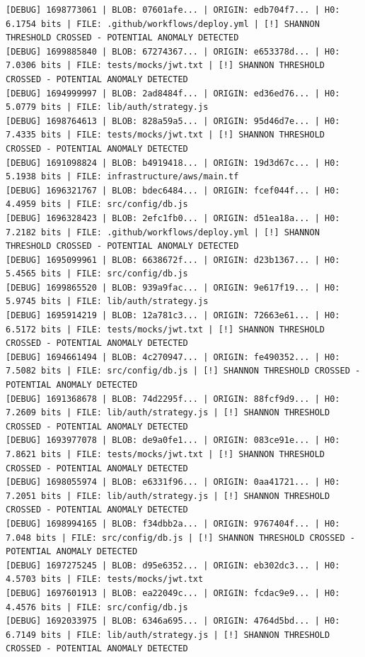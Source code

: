 \documentclass[12pt, a4paper, oneside]{report}
\begin{document}
\begin{lstlisting}[basicstyle=\tiny\ttfamily]
[DEBUG] 1698773061 | BLOB: 07601afe... | ORIGIN: edb704f7... | H0: 6.1754 bits | FILE: .github/workflows/deploy.yml | [!] SHANNON THRESHOLD CROSSED - POTENTIAL ANOMALY DETECTED
[DEBUG] 1699885840 | BLOB: 67274367... | ORIGIN: e653378d... | H0: 7.0306 bits | FILE: tests/mocks/jwt.txt | [!] SHANNON THRESHOLD CROSSED - POTENTIAL ANOMALY DETECTED
[DEBUG] 1694999997 | BLOB: 2ad8484f... | ORIGIN: ed36ed76... | H0: 5.0779 bits | FILE: lib/auth/strategy.js
[DEBUG] 1698764613 | BLOB: 828a59a5... | ORIGIN: 95d46d7e... | H0: 7.4335 bits | FILE: tests/mocks/jwt.txt | [!] SHANNON THRESHOLD CROSSED - POTENTIAL ANOMALY DETECTED
[DEBUG] 1691098824 | BLOB: b4919418... | ORIGIN: 19d3d67c... | H0: 5.1938 bits | FILE: infrastructure/aws/main.tf
[DEBUG] 1696321767 | BLOB: bdec6484... | ORIGIN: fcef044f... | H0: 4.4959 bits | FILE: src/config/db.js
[DEBUG] 1696328423 | BLOB: 2efc1fb0... | ORIGIN: d51ea18a... | H0: 7.2182 bits | FILE: .github/workflows/deploy.yml | [!] SHANNON THRESHOLD CROSSED - POTENTIAL ANOMALY DETECTED
[DEBUG] 1695099961 | BLOB: 6638672f... | ORIGIN: d23b1367... | H0: 5.4565 bits | FILE: src/config/db.js
[DEBUG] 1699865520 | BLOB: 939a9fac... | ORIGIN: 9e617f19... | H0: 5.9745 bits | FILE: lib/auth/strategy.js
[DEBUG] 1695914219 | BLOB: 12a781c3... | ORIGIN: 72663e61... | H0: 6.5172 bits | FILE: tests/mocks/jwt.txt | [!] SHANNON THRESHOLD CROSSED - POTENTIAL ANOMALY DETECTED
[DEBUG] 1694661494 | BLOB: 4c270947... | ORIGIN: fe490352... | H0: 7.5082 bits | FILE: src/config/db.js | [!] SHANNON THRESHOLD CROSSED - POTENTIAL ANOMALY DETECTED
[DEBUG] 1691368678 | BLOB: 74d2295f... | ORIGIN: 88fcf9d9... | H0: 7.2609 bits | FILE: lib/auth/strategy.js | [!] SHANNON THRESHOLD CROSSED - POTENTIAL ANOMALY DETECTED
[DEBUG] 1693977078 | BLOB: de9a0fe1... | ORIGIN: 083ce91e... | H0: 7.8621 bits | FILE: tests/mocks/jwt.txt | [!] SHANNON THRESHOLD CROSSED - POTENTIAL ANOMALY DETECTED
[DEBUG] 1698055974 | BLOB: e6331f96... | ORIGIN: 0aa41721... | H0: 7.2051 bits | FILE: lib/auth/strategy.js | [!] SHANNON THRESHOLD CROSSED - POTENTIAL ANOMALY DETECTED
[DEBUG] 1698994165 | BLOB: f34dbb2a... | ORIGIN: 9767404f... | H0: 7.048 bits | FILE: src/config/db.js | [!] SHANNON THRESHOLD CROSSED - POTENTIAL ANOMALY DETECTED
[DEBUG] 1697275245 | BLOB: d95e6352... | ORIGIN: eb302dc3... | H0: 4.5703 bits | FILE: tests/mocks/jwt.txt
[DEBUG] 1697601913 | BLOB: ea22049c... | ORIGIN: fcdac9e9... | H0: 4.4576 bits | FILE: src/config/db.js
[DEBUG] 1692033975 | BLOB: 6346a695... | ORIGIN: 4764d5bd... | H0: 6.7149 bits | FILE: lib/auth/strategy.js | [!] SHANNON THRESHOLD CROSSED - POTENTIAL ANOMALY DETECTED

\end{lstlisting}
\end{document}
